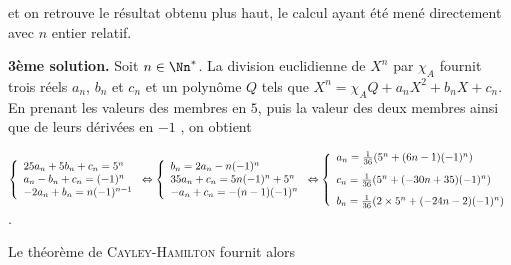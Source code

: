 {{et on retrouve le résultat obtenu plus haut, le calcul ayant été mené directement avec $n$ entier relatif.

\textbf{3ème solution.} Soit $n\in\Nn^*$. La division euclidienne de $X^n$ par $\chi_A$ fournit trois réels $a_n$, $b_n$ et $c_n$ et un polynôme $Q$ tels que $X^n=\chi_AQ+a_nX^2+b_nX+c_n$. En prenant les valeurs des membres en $5$, puis la valeur des deux membres ainsi que de leurs dérivées en $-1$ , on obtient

\begin{center}
$\left\{
\begin{array}{l}
25a_n+5b_n+c_n=5^n\\
a_n-b_n+c_n=(-1)^n\\
-2a_n+b_n=n(-1)^{n-1}
\end{array}
\right.\Leftrightarrow\left\{
\begin{array}{l}
b_n=2a_n-n(-1)^{n}\\
35a_n+c_n=5n(-1)^{n}+5^n\\
-a_n+c_n=-(n-1)(-1)^n
\end{array}
\right.\Leftrightarrow\left\{
\begin{array}{l}
a_n=\frac{1}{36}(5^n+(6n-1)(-1)^n)\\
\rule[-4mm]{0mm}{10mm}c_n=\frac{1}{36}(5^n+(-30n+35)(-1)^n)\\
b_n=\frac{1}{36}(2\times5^n+(-24n-2)(-1)^n)
\end{array}
\right.$.
\end{center}
 

Le théorème de \textsc{Cayley}-\textsc{Hamilton} fournit alors

}}
